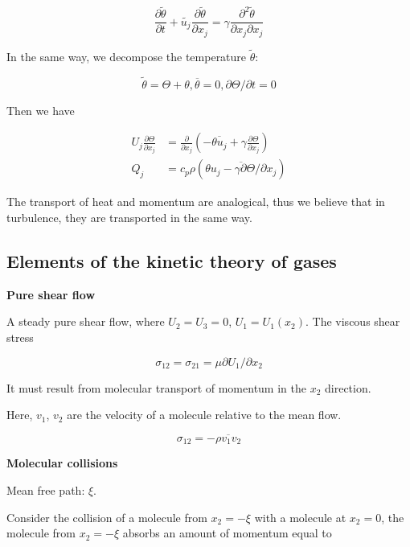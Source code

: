 \documentclass{article}
\begin{document}
\begin{equation*}
    \frac{\partial\tilde\theta}{\partial t}+\tilde{u_j}\frac{\partial\tilde\theta}{\partial x_j}=\gamma\frac{\partial^2\tilde{\theta}}{\partial x_j\partial x_j}
\end{equation*}

In the same way, we decompose the temperature $\tilde\theta$:

\begin{equation*}
    \tilde\theta=\Theta+\theta, \overline\theta=0, \partial\Theta / \partial t=0
\end{equation*}

Then we have

\begin{align*}
    U_j\frac{\partial\Theta}{\partial x_j} & =\frac{\partial}{\partial x_j}\left(-\overline{\theta u_j}+\gamma\frac{\partial\Theta}{\partial x_j}\right) \\
    Q_j                                    & =c_p\rho\left(\overline{\theta u_j-\gamma\partial\Theta / \partial x_j}\right)
\end{align*}

The transport of heat and momentum are analogical, thus we believe that in turbulence, they are transported in the same way.

\subsection{Elements of the kinetic theory of gases}

\textbf{Pure shear flow}

A steady pure shear flow, where $U_2=U_3=0$, $U_1=U_1(x_2)$. The viscous shear stress

\begin{equation*}
    \sigma_{12}=\sigma_{21}=\mu\partial U_1/\partial x_2
\end{equation*}

It must result from molecular transport of momentum  in the $x_2$ direction.

Here, $v_1$, $v_2$ are the velocity of a molecule relative to the mean flow.

\begin{equation*}
    \sigma_{12}=-\overline{\rho v_1 v_2}
\end{equation*}

\textbf{Molecular collisions}

Mean free path: $\xi$.

Consider the collision of a molecule from $x_2=-\xi$ with a molecule at $x_2=0$, the molecule from $x_2=-\xi$ absorbs an amount of momentum equal to 
\end{document}
